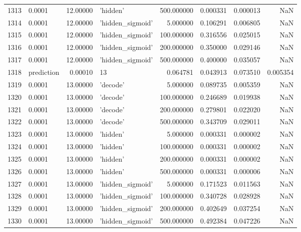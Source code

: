 \documentclass[10pt,a4paper]{article}
\begin{document}
\begin{tabular}{llrlrrrr}
1313 &      0.0001 &  12.00000 &           'hidden' &  500.000000 &  0.000331 &  0.000013 &       NaN \\
1314 &      0.0001 &  12.00000 &   'hidden\_sigmoid' &    5.000000 &  0.106291 &  0.006805 &       NaN \\
1315 &      0.0001 &  12.00000 &   'hidden\_sigmoid' &  100.000000 &  0.316556 &  0.025015 &       NaN \\
1316 &      0.0001 &  12.00000 &   'hidden\_sigmoid' &  200.000000 &  0.350000 &  0.029146 &       NaN \\
1317 &      0.0001 &  12.00000 &   'hidden\_sigmoid' &  500.000000 &  0.400000 &  0.035057 &       NaN \\
1318 &  prediction &   0.00010 &                 13 &    0.064781 &  0.043913 &  0.073510 &  0.005354 \\
1319 &      0.0001 &  13.00000 &           'decode' &    5.000000 &  0.089735 &  0.005359 &       NaN \\
1320 &      0.0001 &  13.00000 &           'decode' &  100.000000 &  0.246689 &  0.019938 &       NaN \\
1321 &      0.0001 &  13.00000 &           'decode' &  200.000000 &  0.279801 &  0.022020 &       NaN \\
1322 &      0.0001 &  13.00000 &           'decode' &  500.000000 &  0.343709 &  0.029011 &       NaN \\
1323 &      0.0001 &  13.00000 &           'hidden' &    5.000000 &  0.000331 &  0.000002 &       NaN \\
1324 &      0.0001 &  13.00000 &           'hidden' &  100.000000 &  0.000331 &  0.000002 &       NaN \\
1325 &      0.0001 &  13.00000 &           'hidden' &  200.000000 &  0.000331 &  0.000002 &       NaN \\
1326 &      0.0001 &  13.00000 &           'hidden' &  500.000000 &  0.000331 &  0.000006 &       NaN \\
1327 &      0.0001 &  13.00000 &   'hidden\_sigmoid' &    5.000000 &  0.171523 &  0.011563 &       NaN \\
1328 &      0.0001 &  13.00000 &   'hidden\_sigmoid' &  100.000000 &  0.340728 &  0.028928 &       NaN \\
1329 &      0.0001 &  13.00000 &   'hidden\_sigmoid' &  200.000000 &  0.402649 &  0.037254 &       NaN \\
1330 &      0.0001 &  13.00000 &   'hidden\_sigmoid' &  500.000000 &  0.492384 &  0.047226 &       NaN \\

\end{tabular}
\end{document}
